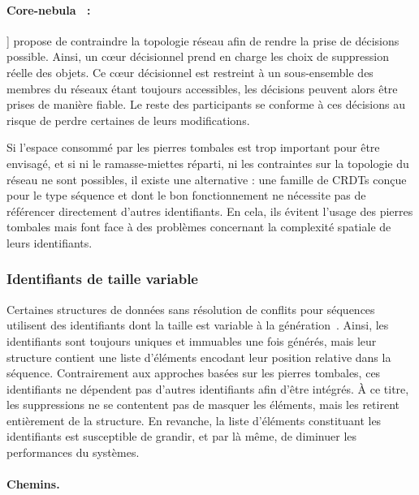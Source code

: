 \paragraph{Core-nebula~\cite{letia2009crdts} :}] propose de contraindre la
topologie réseau afin de rendre la prise de décisions possible. Ainsi, un cœur
décisionnel prend en charge les choix de suppression réelle des objets.  Ce cœur
décisionnel est restreint à un sous-ensemble des membres du réseaux étant
toujours accessibles, les décisions peuvent alors être prises de manière
fiable. Le reste des participants se conforme à ces décisions au risque de
perdre certaines de leurs modifications.
 
Si l'espace consommé par les pierres tombales est trop important pour être
envisagé, et si ni le ramasse-miettes réparti, ni les contraintes sur la
topologie du réseau ne sont possibles, il existe une alternative : une famille
de CRDTs conçue pour le type séquence et dont le bon fonctionnement ne nécessite
pas de référencer directement d'autres identifiants. En cela, ils évitent
l'usage des pierres tombales mais font face à des problèmes concernant la
complexité spatiale de leurs identifiants.

\subsubsection{Identifiants de taille variable}

Certaines structures de données sans résolution de conflits pour séquences
utilisent des identifiants dont la taille est variable à la
génération~\cite{andre2013supporting, preguica2009commutative,
  weiss2009logoot}. Ainsi, les identifiants sont toujours uniques et immuables
une fois générés, mais leur structure contient une liste d'éléments encodant
leur position relative dans la séquence.  Contrairement aux approches basées sur
les pierres tombales, ces identifiants ne dépendent pas d'autres identifiants
afin d'être intégrés. À ce titre, les suppressions ne se contentent pas de
masquer les éléments, mais les retirent entièrement de la structure. En
revanche, la liste d'éléments constituant les identifiants est susceptible de
grandir, et par là même, de diminuer les performances du systèmes.


\paragraph{Chemins.}

